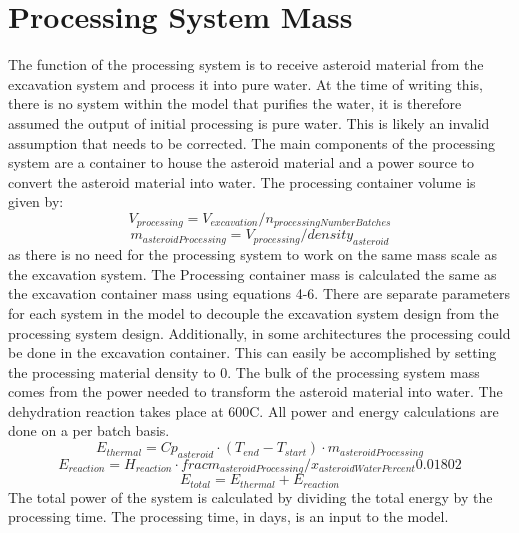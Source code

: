 \section{Processing System Mass}
The function of the processing system is to receive asteroid material from the excavation system and process it into pure water.
At the time of writing this, there is no system within the model that purifies the water, it is therefore assumed the output of initial processing is pure water. This is likely an invalid assumption that needs to be corrected.
The main components of the processing system are a container to house the asteroid material and a power source to convert the asteroid material into water. The processing container volume is given by:
\begin{equation}
    V_{processing} = V_{excavation} / n_{processingNumberBatches}
\end{equation}
\begin{equation}
    m_{asteroidProcessing} = V_{processing} / density_{asteroid}
\end{equation}
as there is no need for the processing system to work on the same mass scale as the excavation system. The Processing container mass is calculated the same as the excavation container mass using equations 4-6. There are separate parameters for each system in the model to decouple the excavation system design from the processing system design. Additionally, in some architectures the processing could be done in the excavation container. This can easily be accomplished by setting the processing material density to 0.
\newline
The bulk of the processing system mass comes from the power needed to transform the asteroid material into water. The dehydration reaction takes place at 600C. All power and energy calculations are done on a per batch basis.
\begin{equation}
    E_{thermal} = Cp_{asteroid} \cdot (T_{end} - T_{start}) \cdot m_{asteroidProcessing}
\end{equation}
\begin{equation}
    E_{reaction} = H_{reaction} \cdot frac{m_{asteroidProcessing} / x_{asteroidWaterPercent}}{0.01802} 
\end{equation}
\begin{equation}
    E_{total} = E_{thermal} + E_{reaction}
\end{equation}
The total power of the system is calculated by dividing the total energy by the processing time. The processing time, in days, is an input to the model.
